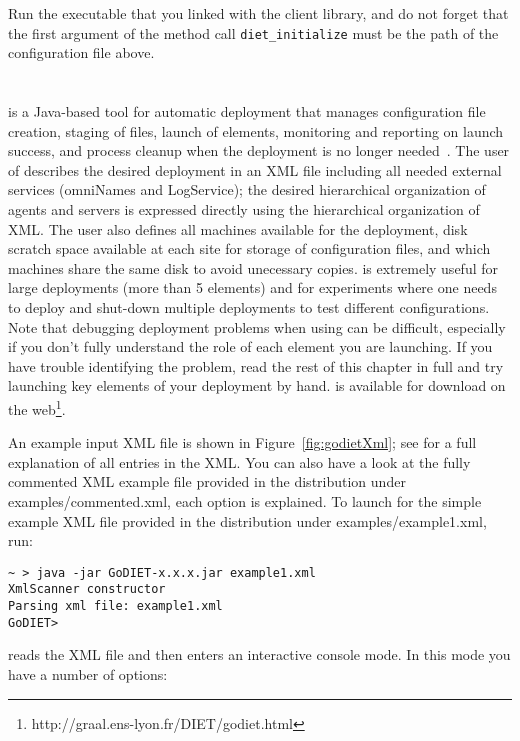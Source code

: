Run the executable that you linked with the \diet client library, and do not
forget that the first argument of the method call \texttt{diet\_initialize}
must be the path of the configuration file above.

\section{\godiet}
\label{sec:deployGoDIET}

\godiet is a Java-based tool for automatic \diet deployment that manages
configuration file creation, staging of files, launch of elements, monitoring
and reporting on launch success, and process cleanup when the \diet deployment
is no longer needed~\cite{CDa05}. The user of \godiet describes the desired
deployment in an XML file including all needed external services (\eg omniNames
and LogService); the desired hierarchical organization of agents and servers is
expressed directly using the hierarchical organization of XML. The user also
defines all machines available for the deployment, disk scratch space available
at each site for storage of configuration files, and which machines share the
same disk to avoid unecessary copies. \godiet is extremely useful for large
deployments (\eg more than 5 elements) and for experiments where one needs to
deploy and shut-down multiple deployments to test different
configurations. Note that debugging deployment problems when using \godiet can
be difficult, especially if you don't fully understand the role of each element
you are launching. If you have trouble identifying the problem, read the rest
of this chapter in full and try launching key elements of your deployment by
hand. \godiet is available for download on the
web\footnote{http://graal.ens-lyon.fr/DIET/godiet.html}.

An example input XML file is shown in Figure~\ref{fig:godietXml}; see
\cite{CDa05} for a full explanation of all entries in the XML. You can also
have a look at the fully commented XML example file provided in the \godiet
distribution under examples/commented.xml, each option is explained. To launch
\godiet for the simple example XML file provided in the \godiet distribution
under examples/example1.xml, run:

\begin{verbatim}
~ > java -jar GoDIET-x.x.x.jar example1.xml
XmlScanner constructor
Parsing xml file: example1.xml
GoDIET>
\end{verbatim}

\godiet reads the XML file and then enters an interactive console mode. In this
mode you have a number of options:

